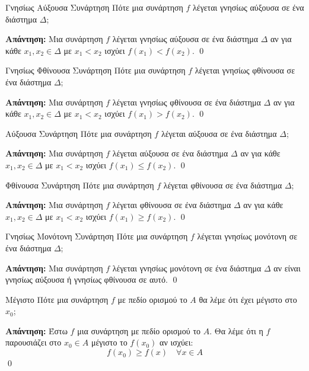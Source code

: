 \documentclass[a4paper, 12pt]{article}
\renewenvironment{proof}[1][\textbf{Απάντηση}]{%
  \par\noindent\textbf{#1:} \rmfamily}{\qed\par}
\begin{document}
\begin{theorem}{Γνησίως Αύξουσα Συνάρτηση}
  Πότε μια συνάρτηση $f$ λέγεται γνησίως αύξουσα σε ένα διάστημα $Δ$;
\end{theorem}
\begin{proof}
  Μια συνάρτηση $f$ λέγεται γνησίως αύξουσα σε ένα διάστημα $Δ$ αν για κάθε $x_1, x_2 \in Δ$ με $x_1 < x_2$ ισχύει $f(x_1) < f(x_2)$.
\end{proof}

\begin{theorem}{Γνησίως Φθίνουσα Συνάρτηση}
  Πότε μια συνάρτηση $f$ λέγεται γνησίως φθίνουσα σε ένα διάστημα $Δ$;
\end{theorem}
\begin{proof}
  Μια συνάρτηση $f$ λέγεται γνησίως φθίνουσα σε ένα διάστημα $Δ$ αν για κάθε $x_1, x_2 \in Δ$ με $x_1 < x_2$ ισχύει $f(x_1) > f(x_2)$.
\end{proof}

\begin{theorem}{Αύξουσα Συνάρτηση}
  Πότε μια συνάρτηση $f$ λέγεται αύξουσα σε ένα διάστημα $Δ$;
\end{theorem}
\begin{proof}
  Μια συνάρτηση $f$ λέγεται αύξουσα σε ένα διάστημα $Δ$ αν για κάθε $x_1, x_2 \in Δ$ με $x_1 < x_2$ ισχύει $f(x_1) \leq f(x_2)$.
\end{proof}

\begin{theorem}{Φθίνουσα Συνάρτηση}
  Πότε μια συνάρτηση $f$ λέγεται φθίνουσα σε ένα διάστημα $Δ$;
\end{theorem}
\begin{proof}
  Μια συνάρτηση $f$ λέγεται φθίνουσα σε ένα διάστημα $Δ$ αν για κάθε $x_1, x_2 \in Δ$ με $x_1 < x_2$ ισχύει $f(x_1) \geq f(x_2)$.
\end{proof}

\begin{theorem}{Γνησίως Μονότονη Συνάρτηση}
  Πότε μια συνάρτηση $f$ λέγεται γνησίως μονότονη σε ένα διάστημα $Δ$;
\end{theorem}
\begin{proof}
  Μια συνάρτηση $f$ λέγεται γνησίως μονότονη σε ένα διάστημα $Δ$ αν είναι γνησίως αύξουσα ή γνησίως φθίνουσα σε αυτό.
\end{proof}

\begin{theorem}{Μέγιστο}
  Πότε μια συνάρτηση $f$ με πεδίο ορισμού το $A$ θα λέμε ότι έχει μέγιστο στο $x_0$;
\end{theorem}
\begin{proof}
  Έστω $f$ μια συνάρτηση με πεδίο ορισμού το $A$. Θα λέμε ότι η $f$ παρουσιάζει στο $x_0\in Α$ μέγιστο το $f(x_0)$ αν ισχύει:
  $$f(x_0) \geq f(x) \quad \forall x \in A$$
\end{proof}
\end{document}

